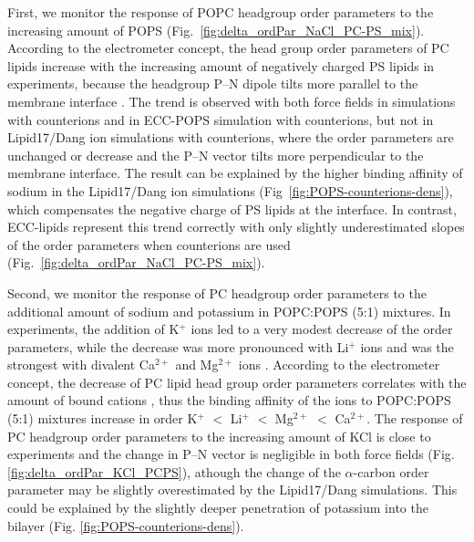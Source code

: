 \documentclass[journal=jpcbfk,manuscript=article]{achemso}
\begin{document}
First, we monitor the response of POPC headgroup order parameters to the increasing amount of POPS (Fig.~\ref{fig:delta_ordPar_NaCl_PC-PS_mix}).
According to the electrometer concept, the head group order parameters of PC lipids increase
with the increasing amount of negatively charged PS lipids in experiments, because the headgroup P--N dipole
tilts more parallel to the membrane interface \cite{seelig87,scherer87}.
The trend is observed with both force fields in simulations with  counterions and
in ECC-POPS simulation with  counterions, but not in Lipid17/Dang ion simulations with  counterions,
where the order parameters are unchanged or decrease and the P--N vector tilts more perpendicular to the membrane interface.
The result can be explained by the higher binding affinity of sodium in the
Lipid17/Dang ion simulations (Fig~\ref{fig:POPS-counterions-dens}), which
compensates the negative charge of PS lipids at the interface.
In contrast, ECC-lipids represent this trend correctly
with only slightly underestimated slopes of the order parameters 
when  counterions are used (Fig.~\ref{fig:delta_ordPar_NaCl_PC-PS_mix}). 


Second, we monitor the response of PC headgroup order parameters to the additional
amount of sodium and potassium in POPC:POPS (5:1) mixtures.
In experiments, the addition of K$^+$ ions led to a very modest decrease of the order parameters,
while the decrease was more pronounced with Li$^+$ ions and was the strongest with divalent Ca$^{2+}$ and Mg$^{2+}$ ions \cite{roux90}.
According to the electrometer concept, the decrease of PC lipid head group order parameters
correlates with the amount of bound cations \cite{akutsu81,altenbach84,seelig87,roux90,catte16,NMRlipidsIV},
thus the binding affinity of the ions to POPC:POPS (5:1) mixtures increase in order K$^{+}$ $<$ Li$^{+}$  $<$ Mg$^{2+}$  $<$ Ca$^{2+}$.
The response of PC headgroup order parameters to the increasing amount of KCl is close to experiments
and the change in P--N vector is negligible in both force fields (Fig. \ref{fig:delta_ordPar_KCl_PCPS}), athough the change of the $\alpha$-carbon
order parameter may be slightly overestimated by the Lipid17/Dang simulations. 
This could be explained by the slightly deeper penetration of potassium into the bilayer (Fig. \ref{fig:POPS-counterions-dens}).
\end{document}
